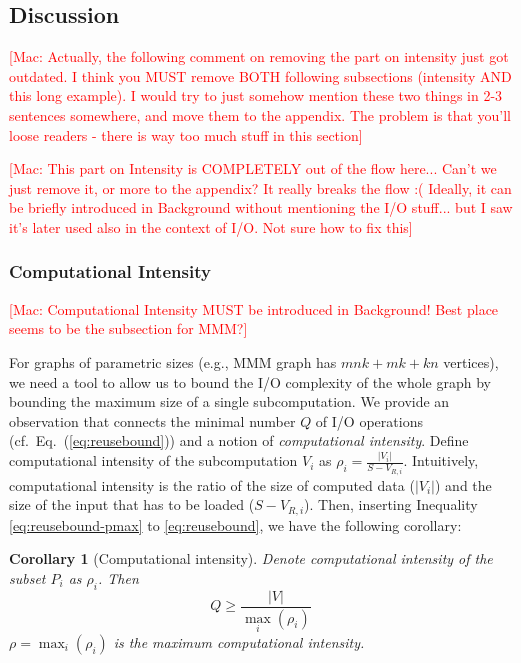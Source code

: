 \documentclass[sigplan,review,anonymous]{acmart}\settopmatter{printfolios=true,printccs=false,printacmref=false}
\newtheorem*{corollary*}{Corollary}
\newcommand\mac[1]{\textcolor{red}{[Mac: #1]}}
\begin{document}

\subsection{Discussion}

\mac{Actually, the following comment on removing the part on intensity
	just got outdated. I think you MUST remove BOTH following subsections
	(intensity AND this long example). I would try to just somehow mention these
	two things in 2-3 sentences somewhere, and move them to the appendix.
	The problem is that you'll loose readers - there is way too much stuff
	in this section}

\mac{This part on Intensity is COMPLETELY out of the flow here...
	Can't we just remove it, or more to the appendix? It really breaks the flow 
	:(
	Ideally, it can be briefly introduced in Background without mentioning the 
	I/O
	stuff... but I saw it's later used also in the context of I/O. Not sure
	how to fix this}

\subsubsection{Computational Intensity}

\mac{Computational Intensity MUST be introduced in Background! Best place
	seems to be the subsection for MMM?}

For graphs of parametric sizes (e.g., MMM graph has $mnk + mk + kn$ vertices), 
we need a tool to allow us to bound the I/O complexity of the whole graph by 
bounding the maximum size of a single subcomputation. We provide an observation 
that connects the minimal 
number $Q$ of
I/O operations
(cf.~Eq.~(\ref{eq:reusebound})) and a notion
of \emph{computational intensity}.
%
Define computational intensity of the subcomputation $V_i$ as $\rho_i =
\frac{|V_i|}{S-V_{R,i}}$. Intuitively, computational intensity is the ratio of 
the size of computed data ($|V_i|$) and the size of the input that has to be 
loaded ($S-V_{R,i}$).
Then, inserting Inequality \ref{eq:reusebound-pmax} to \ref{eq:reusebound}, we 
have the following corollary:

\begin{corollary*}[Computational intensity]
	\label{cor:q}
	Denote computational intensity of the subset $P_i$ as $\rho_i$. Then
	\begin{equation}
	Q \ge \frac{|V|}{\max_i(\rho_i)}
	\end{equation} 
	$\rho = \max_i(\rho_i)$ is the \emph{maximum} computational intensity.
\end{corollary*}
\end{document}
